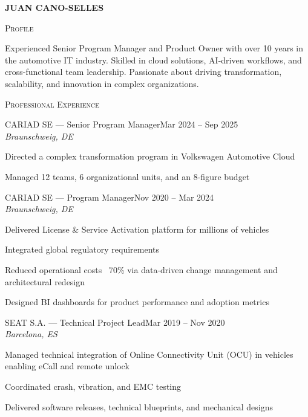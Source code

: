 \documentclass[11pt, a4paper]{article}
\newcommand{\headright}[1]{\vspace*{2ex}\textsc{\large\color{cvblue}#1}\par%
  \vspace*{-1.4ex}{\color{cvblue}\hrulefill}\par}
\newlength{\SideBarW}
\newlength{\BetweenJobsGap}
\newlength{\RightColMargin}
\newenvironment{job}[4]{%
  \vspace{\BetweenJobsGap}%
  \noindent\textsc{#1} --- #2\hfill {\small #4}\\%
  {\small\itshape #3}\par
  \begin{list}{--}{%
      \setlength{\leftmargin}{1.4em}%
      \setlength{\labelsep}{0.5em}%
      \setlength{\itemsep}{0.45ex}%
      \setlength{\topsep}{0.2ex}%
      \setlength{\rightmargin}{\RightColMargin}%
      \setlength{\listparindent}{0pt}%
      \setlength{\parsep}{0pt}%
    }%
}{%
  \end{list}%
}
\begin{document}
\begin{minipage}[t]{\dimexpr\textwidth-\SideBarW-3mm\relax}
  \setlength{\parskip}{0.8ex}
  \setlength{\leftskip}{4mm}
  \setlength{\rightskip}{\RightColMargin}

  \vspace*{6mm}
  {\fontsize{28}{30}\sffont\bfseries\MakeUppercase{\textcolor{cvblue}{Juan Cano-Selles}}}\par
  \vspace*{1.0ex}

  \headright{Profile}
  Experienced Senior Program Manager and Product Owner with over 10 years in the automotive IT industry. Skilled in cloud solutions, AI-driven workflows, and cross-functional team leadership. Passionate about driving transformation, scalability, and innovation in complex organizations.

  \headright{Professional Experience}

  \begin{job}{CARIAD SE}{Senior Program Manager}{Braunschweig, DE}{Mar 2024 -- Sep 2025}
    \item Directed a complex transformation program in Volkswagen Automotive Cloud
    \item Managed 12 teams, 6 organizational units, and an 8-figure budget
  \end{job}

  \begin{job}{CARIAD SE}{Program Manager}{Braunschweig, DE}{Nov 2020 -- Mar 2024}
    \item Delivered License \& Service Activation platform for millions of vehicles
    \item Integrated global regulatory requirements
    \item Reduced operational costs ~70\% via data-driven change management and architectural redesign
    \item Designed BI dashboards for product performance and adoption metrics
  \end{job}

  \begin{job}{SEAT S.A.}{Technical Project Lead}{Barcelona, ES}{Mar 2019 -- Nov 2020}
    \item Managed technical integration of Online Connectivity Unit (OCU) in vehicles enabling eCall and remote unlock
    \item Coordinated crash, vibration, and EMC testing
    \item Delivered software releases, technical blueprints, and mechanical designs
  \end{job}


\end{minipage}
\end{document}
